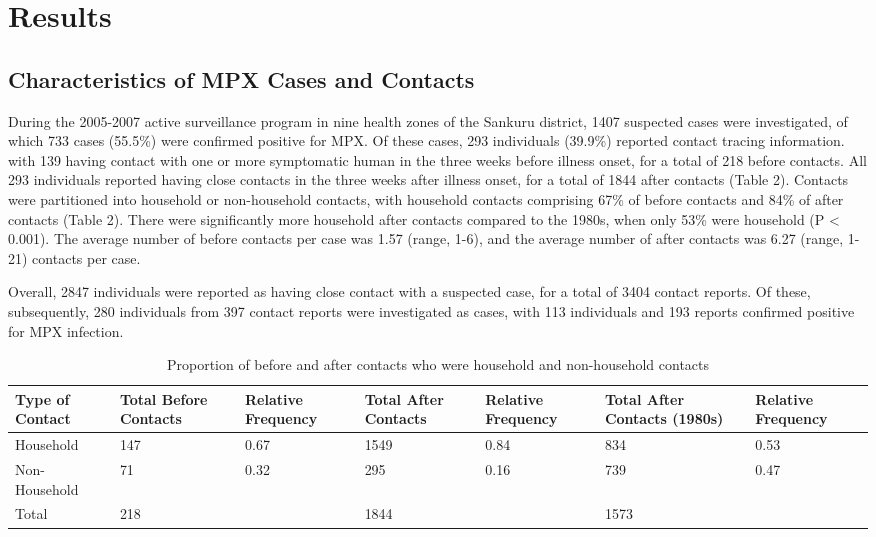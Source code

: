 \section{Results}

\subsection{Characteristics of MPX Cases and Contacts}

During the 2005-2007 active surveillance program in nine health zones of the Sankuru district, 1407 suspected cases were investigated, of which 733 cases (55.5\%) were confirmed positive for MPX. Of these cases, 293 individuals (39.9\%) reported contact tracing information. with 139 having contact with one or more symptomatic human in the three weeks before illness onset, for a total of 218 before contacts. All 293 individuals reported having close contacts in the three weeks after illness onset, for a total of 1844 after contacts (Table 2). Contacts were partitioned into household or non-household contacts, with household contacts comprising 67\% of before contacts and 84\% of after contacts (Table 2). There were significantly more household after contacts compared to the 1980s, when only 53\% were household (P < 0.001). The average number of before contacts per case was 1.57 (range, 1-6), and the average number of after contacts was 6.27 (range, 1-21) contacts per case. 

Overall, 2847 individuals were reported as having close contact with a suspected case, for a total of 3404 contact reports. Of these, 
subsequently, 280 individuals from 397 contact reports were investigated as cases, with 113 individuals and 193 reports confirmed positive for MPX infection. 

\begin{table}[!h]
\begin{tabular}{lp{1.4cm}p{1.4cm}p{1.4cm}p{1.4cm}p{1.4cm}p{1.4cm}} 
\toprule
Type of Contact & Total Before Contacts & Relative Frequency &	Total After Contacts &	Relative Frequency & Total After Contacts (1980s) & Relative Frequency \\
\midrule
Household & 147 & 0.67 & 1549 &	0.84 & 834 & 0.53 \\
Non-Household &	71 & 0.32 &	295	& 0.16 & 739 & 0.47 \\
\midrule
Total &	218	& &	1844 &	& 1573 & \\
\bottomrule
\end{tabular}
\caption{Proportion of before and after contacts who were household and non-household contacts}
\label{tab:table1}
\end{table}


